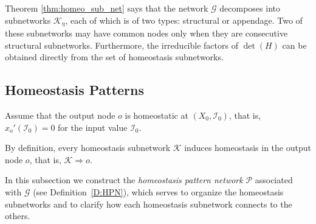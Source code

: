 \documentclass[a4paper,fleqn]{cas-dc}
\newcommand{\II}{{\mathcal I}}
\newcommand{\END}{\hfill\mbox{\raggedright \mbox{\raisebox{2pt}{\scalebox{0.6}{$\Diamond$}}}}\medskip}
\begin{document}
Theorem \ref{thm:homeo_sub_net} says that the network $\mathcal{G}$ decomposes into subnetworks $\mathcal{K}_\eta$, each of which is of two types: structural or appendage.
Two of these subnetworks may have common nodes only when they are consecutive structural subnetworks.
Furthermore, the irreducible factors of $\det(H)$ can be obtained directly from the set of homeostasis subnetworks.


\subsection{Homeostasis Patterns}


\begin{definition} \label{D:homeo_inducing}
Assume that the output node $o$ is homeostatic at $(X_0,\II_0)$, that is, $x_o'(\II_0) = 0$ for the input value $\II_0$.
\end{definition}

By definition, every homeostasis subnetwork $\mathcal{K}$ induces homeostasis in the output node $o$, that is, $\mathcal{K} \Rightarrow o$.

In this subsection we construct the \emph{homeostasis pattern network} $\mathcal{P}$ associated with $\mathcal{G}$ (see
Definition~\ref{D:HPN}), which serves to organize the homeostasis subnetworks and to clarify how each homeostasis subnetwork connects to the others.
\end{document}
